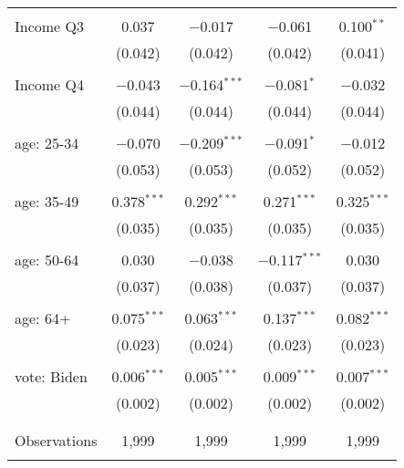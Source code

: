 \begin{tabular}{@{\extracolsep{5pt}}lcccc}
  & & & & \\ 
 Income Q3 & 0.037 & $-$0.017 & $-$0.061 & 0.100$^{**}$ \\ 
  & (0.042) & (0.042) & (0.042) & (0.041) \\ 
  & & & & \\ 
 Income Q4 & $-$0.043 & $-$0.164$^{***}$ & $-$0.081$^{*}$ & $-$0.032 \\ 
  & (0.044) & (0.044) & (0.044) & (0.044) \\ 
  & & & & \\ 
 age: 25-34 & $-$0.070 & $-$0.209$^{***}$ & $-$0.091$^{*}$ & $-$0.012 \\ 
  & (0.053) & (0.053) & (0.052) & (0.052) \\ 
  & & & & \\ 
 age: 35-49 & 0.378$^{***}$ & 0.292$^{***}$ & 0.271$^{***}$ & 0.325$^{***}$ \\ 
  & (0.035) & (0.035) & (0.035) & (0.035) \\ 
  & & & & \\ 
 age: 50-64 & 0.030 & $-$0.038 & $-$0.117$^{***}$ & 0.030 \\ 
  & (0.037) & (0.038) & (0.037) & (0.037) \\ 
  & & & & \\ 
 age: 64+ & 0.075$^{***}$ & 0.063$^{***}$ & 0.137$^{***}$ & 0.082$^{***}$ \\ 
  & (0.023) & (0.024) & (0.023) & (0.023) \\ 
  & & & & \\ 
 vote: Biden & 0.006$^{***}$ & 0.005$^{***}$ & 0.009$^{***}$ & 0.007$^{***}$ \\ 
  & (0.002) & (0.002) & (0.002) & (0.002) \\ 
  & & & & \\ 
\hline \\[-1.8ex] 

Observations & 1,999 & 1,999 & 1,999 & 1,999 \\ 
\hline 
\hline \\[-1.8ex] 
\end{tabular} 